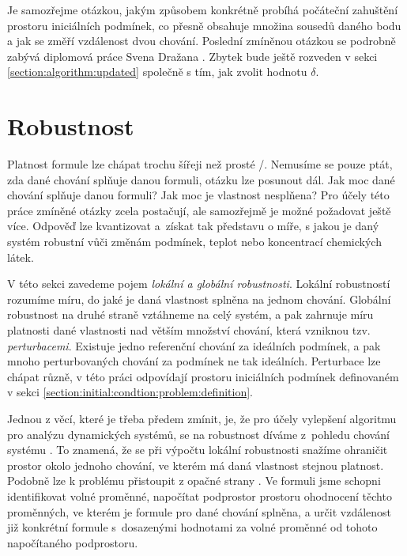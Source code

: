 Je samozřejme otázkou, jakým způsobem konkrétně probíhá počáteční zahuštění prostoru
iniciálních podmínek, co přesně obsahuje mno\-žina sousedů daného bodu a jak
se změří vzdálenost dvou chování. Poslední zmí\-ně\-nou otázkou se podrobně zabývá diplomová práce Svena Dražana \cite{drazan2011}.
Zbytek bude ještě rozveden v sekci \ref{section:algorithm:updated} společně s tím,
jak zvolit hodnotu $\delta$.

\section{Robustnost}\label{section:robustness}

Platnost formule lze chápat trochu šířeji než prosté /.
Nemusíme se pouze ptát, zda dané chování splňuje danou formuli, otázku lze posunout dál.
Jak moc dané chování splňuje danou formuli? Jak moc je vlastnost nesplňena? Pro účely
této práce zmíněné otázky zcela postačují, ale samozřejmě je možné požadovat ještě více.
Odpověď lze kvantizovat a~zís\-kat tak představu o míře, s  jakou je daný systém robustní
vůči změnám podmínek, teplot nebo koncentrací chemických látek.

V této sekci zavedeme pojem \textit{lokální a globální robustnosti}. Lokální robustností
rozumíme míru, do jaké je daná vlastnost splněna na jednom chování. Globální robustnost
na druhé straně vztáhneme na celý systém, a pak zahrnuje míru platnosti dané vlastnosti
nad větším množství chování, která vzniknou tzv. \textit{perturbacemi}. Existuje jedno
referenční chování za ideálních podmínek, a pak mnoho perturbovaných chování za podmínek
ne tak i\-deál\-ních. Perturbace lze chápat různě, v této práci odpovídají prostoru i\-ni\-ciál\-ních
podmínek definovaném v sekci \ref{section:initial:condtion:problem:definition}. 

Jednou z věcí, které je třeba předem zmínit, je, že pro účely vylepšení algoritmu pro
analýzu dynamických systémů, se na robustnost díváme z~pohledu chování systému \cite{donze2011}.
To znamená, že se při výpočtu lokální robustnosti snažíme ohraničit prostor okolo jednoho chování,
ve kterém má daná vlastnost stejnou platnost. Podobně lze k problému přistoupit z opačné strany \cite{rizk2009}.
Ve formuli jsme schopni identifikovat volné proměnné, na\-po\-čí\-tat podprostor prostoru ohodnocení těchto proměnných, ve kterém je formule
pro dané chování splněna, a určit vzdálenost již konkrétní formule s~do\-sa\-ze\-ný\-mi hodnotami za volné proměnné
od tohoto napočítaného podprostoru.


